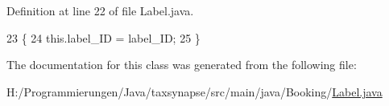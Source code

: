 Definition at line 22 of file Label.\-java.


\begin{DoxyCode}
23     \{
24         this.label\_ID = label\_ID;
25     \}
\end{DoxyCode}


The documentation for this class was generated from the following file\-:\begin{DoxyCompactItemize}
\item 
H\-:/\-Programmierungen/\-Java/taxsynapse/src/main/java/\-Booking/\hyperlink{_label_8java}{Label.\-java}\end{DoxyCompactItemize}
